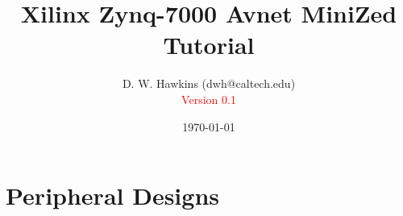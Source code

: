 \documentclass[10pt,twoside]{article}
\begin{document}
\title{Xilinx Zynq-7000 Avnet MiniZed Tutorial}
\author{D. W. Hawkins (dwh@caltech.edu)\\\textcolor{red}{Version 0.1}}
\date{\today}

\maketitle

\tableofcontents

\pagestyle{fancy}

\cleardoublepage

%
%

\clearpage

\clearpage
\clearpage

\clearpage





\clearpage

\clearpage
\section{Peripheral Designs}

\clearpage

\clearpage


\appendix
\clearpage

\clearpage

\clearpage

%
%



\end{document}
